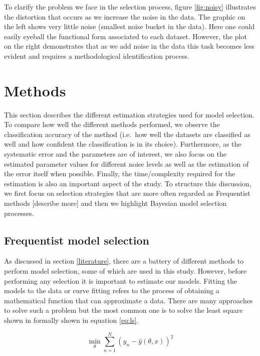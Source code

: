 \documentclass[12pt,]{article}
\begin{document}
To clarify the problem we face in the selection process, figure \ref{fig:noisy} illustrates the distortion that occurs as we increase the noise in the data. The graphic on the left shows very little noise (smallest noise bucket in the data). Here one could easily eyeball the functional form associated to each dataset. However, the plot on the right demonstrates that as we add noise in the data this task becomes less evident and requires a methodological identification process.

\hypertarget{methodology}{%
\section{Methods}\label{methodology}}

This section describes the different estimation strategies used for model selection. To compare how well the different methods performed, we observe the classification accuracy of the method (i.e.~how well the datasets are classified as well and how confident the classification is in its choice). Furthermore, as the systematic error and the parameters are of interest, we also focus on the estimated parameter values for different noise levels as well as the estimation of the error itself when possible. Finally, the time/complexity required for the estimation is also an important aspect of the study. To structure this discussion, we first focus on selection strategies that are more often regarded as Frequentist methods {[}describe more{]} and then we highlight Bayesian model selection processes.

\hypertarget{frequentist}{%
\subsection{Frequentist model selection}\label{frequentist}}

As discussed in section \ref{literature}, there are a battery of different methods to perform model selection, some of which are used in this study. However, before performing any selection it is important to estimate our models. Fitting the models to the data or curve fitting refers to the process of obtaining a mathematical function that can approximate a data. There are many approaches to solve such a problem but the most common one is to solve the least square shown in formally shown in equation \eqref{eq:ls}.

\begin{equation}
\min_{\theta} \sum_{n=1}^{N} (y_n - \hat y(\theta,x))^2  \label{eq:ls}
\end{equation}
\end{document}
